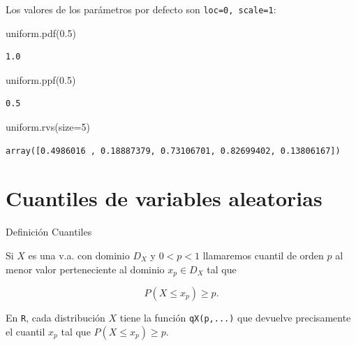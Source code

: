 \documentclass[
  letterpaper,
  DIV=11,
  numbers=noendperiod]{scrreprt}
\newenvironment{Shaded}{\begin{snugshade}}{\end{snugshade}}
\newcommand{\DecValTok}[1]{\textcolor[rgb]{0.68,0.00,0.00}{#1}}
\newcommand{\FloatTok}[1]{\textcolor[rgb]{0.68,0.00,0.00}{#1}}
\newcommand{\NormalTok}[1]{\textcolor[rgb]{0.00,0.23,0.31}{#1}}
\newcommand{\OperatorTok}[1]{\textcolor[rgb]{0.37,0.37,0.37}{#1}}
\begin{document}
Los valores de los parámetros por defecto son \texttt{loc=0,\ scale=1}:

\begin{Shaded}
\begin{Highlighting}[]
\NormalTok{uniform.pdf(}\FloatTok{0.5}\NormalTok{)}
\end{Highlighting}
\end{Shaded}

\begin{verbatim}
1.0
\end{verbatim}

\begin{Shaded}
\begin{Highlighting}[]
\NormalTok{uniform.ppf(}\FloatTok{0.5}\NormalTok{)}
\end{Highlighting}
\end{Shaded}

\begin{verbatim}
0.5
\end{verbatim}

\begin{Shaded}
\begin{Highlighting}[]
\NormalTok{uniform.rvs(size}\OperatorTok{=}\DecValTok{5}\NormalTok{)}
\end{Highlighting}
\end{Shaded}

\begin{verbatim}
array([0.4986016 , 0.18887379, 0.73106701, 0.82699402, 0.13806167])
\end{verbatim}

\section{Cuantiles de variables
aleatorias}\label{cuantiles-de-variables-aleatorias}

\begin{Definicion}{Definición Cuantiles}{}

Si \(X\) es una v.a. con dominio \(D_X\) y \(0<p<1\) llamaremos cuantil
de orden \(p\) al menor valor perteneciente al dominio \(x_p\in D_X\)
tal que

\[P(X\leq x_p)\geq p.\]

En \texttt{R}, cada distribución \(X\) tiene la función
\texttt{qX(p,...)} que devuelve precisamente el cuantil \(x_p\) tal que
\(P(X\leq x_p)\geq p.\)

\end{Definicion}
\end{document}
